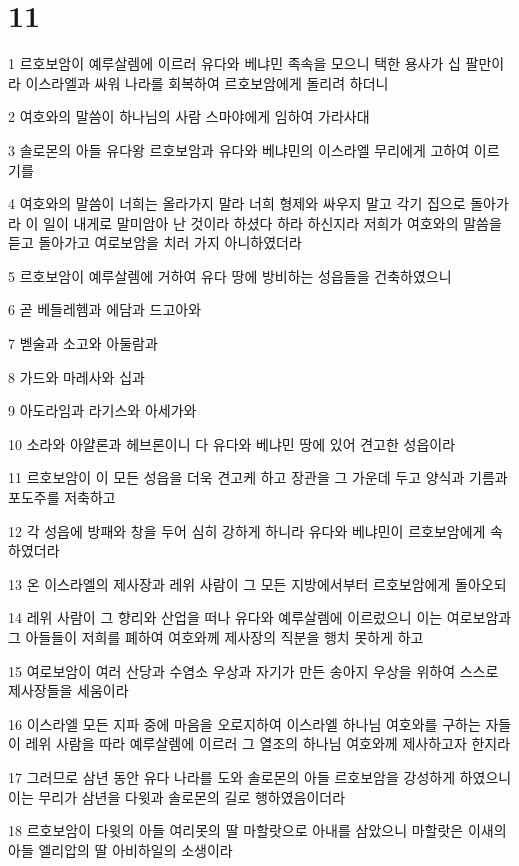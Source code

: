 \chapter{11}

\par 1 르호보암이 예루살렘에 이르러 유다와 베냐민 족속을 모으니 택한 용사가 십 팔만이라 이스라엘과 싸워 나라를 회복하여 르호보암에게 돌리려 하더니
\par 2 여호와의 말씀이 하나님의 사람 스마야에게 임하여 가라사대
\par 3 솔로몬의 아들 유다왕 르호보암과 유다와 베냐민의 이스라엘 무리에게 고하여 이르기를
\par 4 여호와의 말씀이 너희는 올라가지 말라 너희 형제와 싸우지 말고 각기 집으로 돌아가라 이 일이 내게로 말미암아 난 것이라 하셨다 하라 하신지라 저희가 여호와의 말씀을 듣고 돌아가고 여로보암을 치러 가지 아니하였더라
\par 5 르호보암이 예루살렘에 거하여 유다 땅에 방비하는 성읍들을 건축하였으니
\par 6 곧 베들레헴과 에담과 드고아와
\par 7 벧술과 소고와 아둘람과
\par 8 가드와 마레사와 십과
\par 9 아도라임과 라기스와 아세가와
\par 10 소라와 아얄론과 헤브론이니 다 유다와 베냐민 땅에 있어 견고한 성읍이라
\par 11 르호보암이 이 모든 성읍을 더욱 견고케 하고 장관을 그 가운데 두고 양식과 기름과 포도주를 저축하고
\par 12 각 성읍에 방패와 창을 두어 심히 강하게 하니라 유다와 베냐민이 르호보암에게 속하였더라
\par 13 온 이스라엘의 제사장과 레위 사람이 그 모든 지방에서부터 르호보암에게 돌아오되
\par 14 레위 사람이 그 향리와 산업을 떠나 유다와 예루살렘에 이르렀으니 이는 여로보암과 그 아들들이 저희를 폐하여 여호와께 제사장의 직분을 행치 못하게 하고
\par 15 여로보암이 여러 산당과 수염소 우상과 자기가 만든 송아지 우상을 위하여 스스로 제사장들을 세움이라
\par 16 이스라엘 모든 지파 중에 마음을 오로지하여 이스라엘 하나님 여호와를 구하는 자들이 레위 사람을 따라 예루살렘에 이르러 그 열조의 하나님 여호와께 제사하고자 한지라
\par 17 그러므로 삼년 동안 유다 나라를 도와 솔로몬의 아들 르호보암을 강성하게 하였으니 이는 무리가 삼년을 다윗과 솔로몬의 길로 행하였음이더라
\par 18 르호보암이 다윗의 아들 여리못의 딸 마할랏으로 아내를 삼았으니 마할랏은 이새의 아들 엘리압의 딸 아비하일의 소생이라
